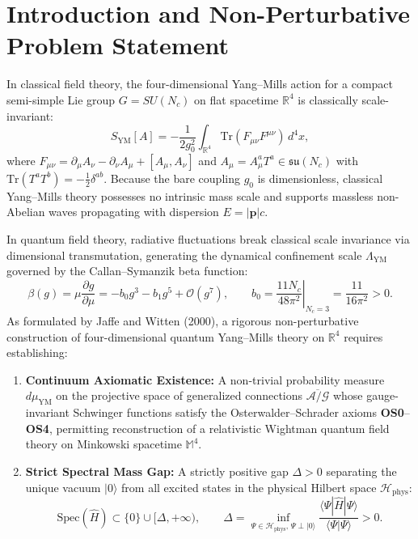 \documentclass[11pt, a4paper]{article}
\theoremstyle{definition}
\theoremstyle{remark}
\begin{document}
\section{Introduction and Non-Perturbative Problem Statement}

In classical field theory, the four-dimensional Yang--Mills action for a compact semi-simple Lie group $G = SU(N_{c})$ on flat spacetime $\mathbb{R}^{4}$ is classically scale-invariant:
\begin{equation}
  S_{\mathrm{YM}}[A] = -\frac{1}{2g_{0}^{2}} \int_{\mathbb{R}^{4}} \mathrm{Tr}(F_{\mu\nu}F^{\mu\nu})\,d^{4}x,
\end{equation}
where $F_{\mu\nu} = \partial_{\mu}A_{\nu} - \partial_{\nu}A_{\mu} + [A_{\mu}, A_{\nu}]$ and $A_{\mu} = A_{\mu}^{a}T^{a} \in \mathfrak{su}(N_{c})$ with $\mathrm{Tr}(T^{a}T^{b}) = -\frac{1}{2}\delta^{ab}$. Because the bare coupling $g_{0}$ is dimensionless, classical Yang--Mills theory possesses no intrinsic mass scale and supports massless non-Abelian waves propagating with dispersion $E = |\mathbf{p}|c$.

In quantum field theory, radiative fluctuations break classical scale invariance via dimensional transmutation, generating the dynamical confinement scale $\Lambda_{\mathrm{YM}}$ governed by the Callan--Symanzik beta function:
\begin{equation}
  \beta(g) = \mu \frac{\partial g}{\partial \mu} = -b_{0}g^{3} - b_{1}g^{5} + \mathcal{O}(g^{7}), \qquad b_{0} = \left.\frac{11N_{c}}{48\pi^{2}}\right|_{N_{c}=3} = \frac{11}{16\pi^{2}} > 0.
\end{equation}
As formulated by Jaffe and Witten (2000), a rigorous non-perturbative construction of four-dimensional quantum Yang--Mills theory on $\mathbb{R}^{4}$ requires establishing:
\begin{enumerate}
  \item \textbf{Continuum Axiomatic Existence:} A non-trivial probability measure $d\mu_{\mathrm{YM}}$ on the projective space of generalized connections $\overline{\mathcal{A}/\mathcal{G}}$ whose gauge-invariant Schwinger functions satisfy the Osterwalder--Schrader axioms \textbf{OS0}--\textbf{OS4}, permitting reconstruction of a relativistic Wightman quantum field theory on Minkowski spacetime $\mathbb{M}^{4}$.
  \item \textbf{Strict Spectral Mass Gap:} A strictly positive gap $\Delta > 0$ separating the unique vacuum $|0\rangle$ from all excited states in the physical Hilbert space $\mathcal{H}_{\mathrm{phys}}$:
  \begin{equation}
    \mathrm{Spec}(\hat{H}) \subset \{0\} \cup [\Delta, +\infty), \qquad \Delta = \inf_{\Psi \in \mathcal{H}_{\mathrm{phys}},\, \Psi \perp |0\rangle} \frac{\langle \Psi | \hat{H} | \Psi \rangle}{\langle \Psi | \Psi \rangle} > 0.
  \end{equation}
\end{enumerate}
\end{document}
